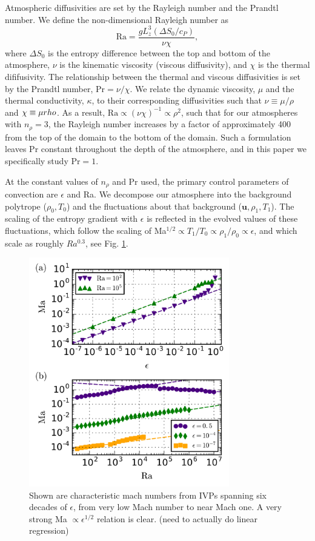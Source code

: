 \documentclass[aps, prl, twocolumn, groupedaddress]{revtex4-1}
\begin{document}
Atmospheric diffusivities are set by the Rayleigh number and the Prandtl number.  We define the
non-dimensional Rayleigh number as
\begin{equation}
\text{Ra} = \frac{g L_z^3 (\Delta S_0 / c_P)}{\nu\chi},
\end{equation}
where $\Delta S_0$ is the entropy difference between the top and bottom of the atmosphere, 
$\nu$ is the kinematic viscosity (viscous diffusivity), and $\chi$ is the thermal dififusivity.  
The relationship between the thermal and viscous diffusivities is
set by the Prandtl number, Pr$ = \nu/\chi$.   We relate the dynamic viscosity, $\mu$ and the thermal conductivity,
$\kappa$, to their corresponding diffusivities such that 
$\nu \equiv \mu/\rho$ and $\chi \equiv \mu\/rho$.  As a result, $\text{Ra} \propto (\nu\chi)^{-1} \propto
\rho^2$, such that for our atmospheres with $n_{\rho} = 3$, the Rayleigh number increases by a factor of
approximately 400 from the top of the domain to the bottom of the domain.  Such a formulation leaves Pr
constant throughout the depth of the atmosphere, and in this paper we specifically study $\text{Pr} = 1$.

At the constant values of $n_\rho$ and Pr used, the primary control parameters of convection are $\epsilon$
and Ra.  We decompose our atmosphere into the background polytrope ($\rho_{0}, T_{0}$) and the fluctuations
about that background ($\bm{u}, \rho_{1}, T_{1}$).  The scaling of the entropy gradient with $\epsilon$
is reflected in the evolved values of these fluctuations, which follow the scaling of
Ma$^{1/2} \propto T_1/T_0 \propto \rho_{1}/\rho_{0} \propto \epsilon$, and which scale as roughly $Ra^{0.3}$,
see Fig. \ref{fig:ma_v_eps}.

\begin{figure}[t]
\includegraphics[width=3.4375in]{./figs/ma_v_eps.png}
\caption{Shown are characteristic mach numbers from IVPs spanning six decades of $\epsilon$, from
very low Mach number to near Mach one.  A very strong Ma $\propto \epsilon^{1/2}$ relation is clear. 
(need to actually do linear regression)
\label{fig:ma_v_eps} }
\end{figure}
\end{document}
